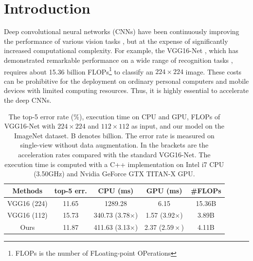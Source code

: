 \documentclass[letterpaper]{article} %
\begin{document}
\section{Introduction}
Deep convolutional neural networks (CNNs) \cite{lecun1990handwritten,krizhevsky2012imagenet} have been continuously improving the performance of various vision tasks \cite{simonyan2014very,he2016deep,long2015fully,lin2017cross,chen2016disc,chen2016deep}, but at the expense of significantly increased computational complexity. For example, the VGG16-Net \cite{simonyan2014very}, which has demonstrated remarkable performance on a wide range of recognition tasks \cite{long2015fully,ren2015faster,wang2017multi}, requires about 15.36 billion FLOPs\footnote{FLOPs is the number of FLoating-point OPerations} to classify an $224 \times 224$ image. These costs can be prohibitive for the deployment on ordinary personal computers and mobile devices with limited computing resources. Thus, it is highly essential to accelerate the deep CNNs.

\begin{table}[!t]
\centering
\scriptsize
\begin{tabular}{c|c|c|c|c}
\hline
\centering  Methods  & top-5 err.  & CPU (ms) & GPU (ms)  & \#FLOPs\\
\hline
\hline
VGG16 (224)  & 11.65  & 1289.28 & 6.15 & 15.36B \\
VGG16 (112)    &  15.73 & 340.73  (3.78$\times$) &  1.57 (3.92$\times$) & 3.89B\\
Ours   & 11.87  &   411.63 (3.13$\times$) & 2.37 ($2.59\times$) & 4.11B \\
\hline
\end{tabular}
\caption{The top-5 error rate (\%), execution time on CPU and GPU, FLOPs of VGG16-Net with $224 \times 224$ and $112 \times 112$ as input, and our model on the ImageNet dataset. B denotes billion. The error rate is measured on single-view without data augmentation. In the brackets are the acceleration rates compared with the standard VGG16-Net. The execution time is computed with a C++ implementation on Intel i7 CPU (3.50GHz) and Nvidia GeForce GTX TITAN-X GPU.}
\label{table:different_input}
\end{table}
\end{document}
